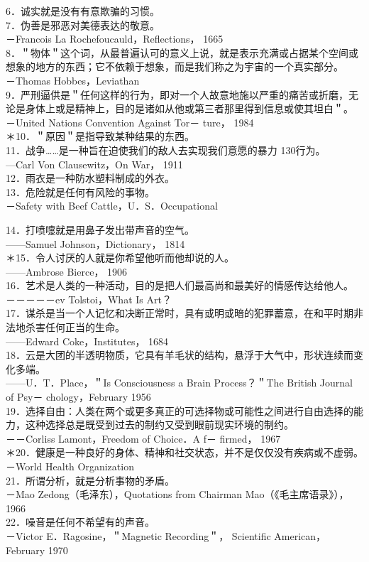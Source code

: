 6．诚实就是没有有意欺骗的习惯。\\
7．伪善是邪恶对美德表达的敬意。\\
－Francois La Rochefoucauld，Reflections， 1665\\
8．＂物体＂这个词，从最普遍认可的意义上说，就是表示充满或占据某个空间或想象的地方的东西；它不依赖于想象，而是我们称之为宇宙的一个真实部分。\\
－Thomas Hobbes，Leviathan\\
9．严刑逼供是＂任何这样的行为，即对一个人故意地施以严重的痛苦或折磨，无论是身体上或是精神上，目的是诸如从他或第三者那里得到信息或使其坦白＂。\\
－United Nations Convention Against Tor－ ture， 1984\\
＊10．＂原因＂是指导致某种结果的东西。\\
11．战争……是一种旨在迫使我们的敌人去实现我们意愿的暴力 130行为。\\
—Carl Von Clausewitz，On War， 1911\\
12．雨衣是一种防水塑料制成的外衣。\\
13．危险就是任何有风险的事物。\\
－Safety with Beef Cattle，U．S．Occupational

14．打喷嚏就是用鼻子发出带声音的空气。\\
——Samuel Johnson，Dictionary， 1814\\
＊15．令人讨厌的人就是你希望他听而他却说的人。\\
——Ambrose Bierce， 1906\\
16．艺术是人类的一种活动，目的是把人们最高尚和最美好的情感传达给他人。\\
－－－－－ev Tolstoi，What Is Art？\\
17．谋杀是当一个人记忆和决断正常时，具有或明或暗的犯罪蓄意，在和平时期非法地杀害任何正当的生命。\\
——Edward Coke，Institutes， 1684\\
18．云是大团的半透明物质，它具有羊毛状的结构，悬浮于大气中，形状连续而变化多端。\\
——U．T．Place，＂Is Consciousness a Brain Process？＂The British Journal of Psy－ chology，February 1956\\
19．选择自由：人类在两个或更多真正的可选择物或可能性之间进行自由选择的能力，这种选择总是既受到过去的制约又受到眼前现实环境的制约。\\
－－Corliss Lamont，Freedom of Choice．A f－ firmed， 1967\\
＊20．健康是一种良好的身体、精神和社交状态，并不是仅仅没有疾病或不虚弱。\\
－World Health Organization\\
21．所谓分析，就是分析事物的矛盾。\\
－Mao Zedong（毛泽东），Quotations from Chairman Mao（《毛主席语录》）， 1966\\
22．噪音是任何不希望有的声音。\\
－Victor E．Ragosine，＂Magnetic Recording＂， Scientific American，February 1970

